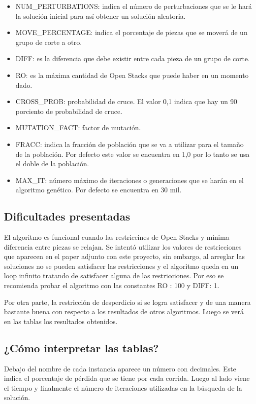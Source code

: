 \documentclass[letter,10pt]{article}
\begin{document}
\begin{itemize}
\item NUM\_PERTURBATIONS: indica el número de perturbaciones que se le hará la solución inicial 
para así obtener un solución aleatoria.
\item MOVE\_PERCENTAGE: indica el porcentaje de piezas que se moverá de un grupo de corte a otro.
\item DIFF: es la diferencia que debe existir entre cada pieza de un grupo de corte.
\item RO: es la máxima cantidad de Open Stacks que puede haber en un momento dado.
\item CROSS\_PROB: probabilidad de cruce. El valor 0,1 indica que hay un 90 porciento de probabilidad de cruce.
\item MUTATION\_FACT: factor de mutación. 
\item FRACC: indica la fracción de población que se va a utilizar para el tamaño de la población. Por defecto 
este valor se encuentra en 1,0 por lo tanto se usa el doble de la población.
\item MAX\_IT: número máximo de iteraciones o generaciones que se harán en el algoritmo genético. Por defecto se 
 encuentra en 30 mil.
\end{itemize}

\subsection{Dificultades presentadas}

El algoritmo es funcional cuando las restriccines de Open Stacks y mínima diferencia entre piezas se relajan. 
Se intentó utilizar los valores de restricciones que aparecen en el paper adjunto con este proyecto, sin embargo,
al arreglar las soluciones no se pueden satisfacer las restricciones y el algoritmo queda en un loop infinito 
tratando de satisfacer alguna de las restricciones. Por eso se recomienda probar el algoritmo con las constantes 
RO : 100 y DIFF: 1. 

Por otra parte, la restricción de desperdicio si se logra satisfacer y de una manera bastante buena con respecto a 
los resultados de otros algoritmos. Luego se verá en las tablas los resultados obtenidos.

\subsection{¿Cómo interpretar las tablas?}

Debajo del nombre de cada instancia aparece un número con decimales. Este indica el porcentaje de pérdida que se tiene 
por cada corrida. Luego al lado viene el tiempo y finalmente el número de iteraciones utilizadas en la búsqueda de la 
solución. 
\end{document}
